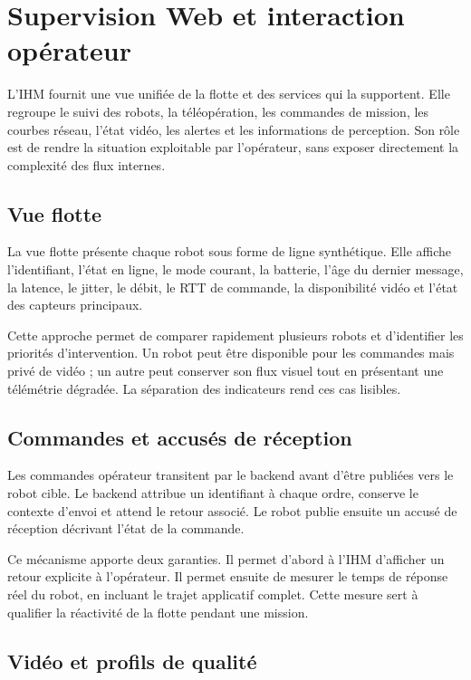 \section{Supervision Web et interaction opérateur}

L'IHM fournit une vue unifiée de la flotte et des services qui la supportent. Elle regroupe le suivi des robots, la téléopération, les commandes de mission, les courbes réseau, l'état vidéo, les alertes et les informations de perception. Son rôle est de rendre la situation exploitable par l'opérateur, sans exposer directement la complexité des flux internes.

\subsection{Vue flotte}

La vue flotte présente chaque robot sous forme de ligne synthétique. Elle affiche l'identifiant, l'état en ligne, le mode courant, la batterie, l'âge du dernier message, la latence, le jitter, le débit, le RTT de commande, la disponibilité vidéo et l'état des capteurs principaux.

Cette approche permet de comparer rapidement plusieurs robots et d'identifier les priorités d'intervention. Un robot peut être disponible pour les commandes mais privé de vidéo ; un autre peut conserver son flux visuel tout en présentant une télémétrie dégradée. La séparation des indicateurs rend ces cas lisibles.

\subsection{Commandes et accusés de réception}

Les commandes opérateur transitent par le backend avant d'être publiées vers le robot cible. Le backend attribue un identifiant à chaque ordre, conserve le contexte d'envoi et attend le retour associé. Le robot publie ensuite un accusé de réception décrivant l'état de la commande.

Ce mécanisme apporte deux garanties. Il permet d'abord à l'IHM d'afficher un retour explicite à l'opérateur. Il permet ensuite de mesurer le temps de réponse réel du robot, en incluant le trajet applicatif complet. Cette mesure sert à qualifier la réactivité de la flotte pendant une mission.

\subsection{Vidéo et profils de qualité}


